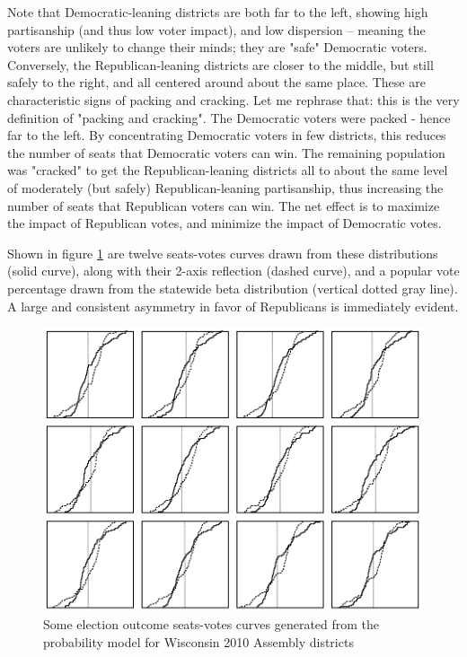 \documentclass[preprint,12pt]{article}
\begin{document}
Note that Democratic-leaning districts are both far to the left, showing high partisanship (and thus low voter impact), and low dispersion -- meaning the voters are unlikely to change their minds; they are "safe" Democratic voters.  Conversely, the Republican-leaning districts are closer to the middle, but still safely to the right, and all centered around about the same place.   These are characteristic signs of packing and cracking.  Let me rephrase that: this is the very definition of "packing and cracking".  The Democratic voters were packed - hence far to the left.  By concentrating Democratic voters in few districts, this reduces the number of seats that Democratic voters can win.  The remaining population was "cracked" to get the Republican-leaning districts all to about the same level of moderately (but safely) Republican-leaning partisanship, thus increasing the number of seats that Republican voters can win.  The net effect is to maximize the impact of Republican votes, and minimize the impact of Democratic votes.
 
Shown in figure \ref{fig:SVAssembly} are twelve seats-votes curves drawn from these distributions (solid curve), along with their 2-axis reflection (dashed curve), and a popular vote percentage drawn from the statewide beta distribution (vertical dotted gray line).  A large and consistent asymmetry in favor of Republicans is immediately evident.

\begin{figure}[htb!]
    \begin{center}
        \includegraphics[scale=0.6]{../Figures/WI2010/sv_curves_assembly.png}
        \caption{Some election outcome seats-votes curves generated from the probability model for Wisconsin 2010 Assembly districts}\label{fig:SVAssembly}
    \end{center}
\end{figure}
\end{document}
